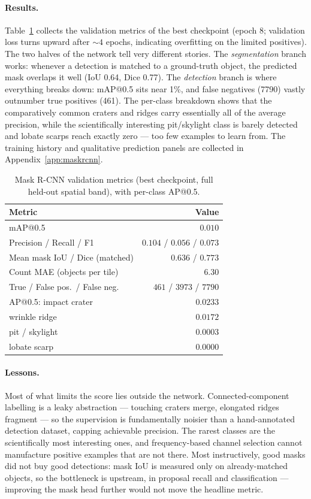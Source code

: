 \documentclass{aa}
\begin{document}
\paragraph{Results.}
Table~\ref{tab:metrics} collects the validation metrics of the best checkpoint (epoch 8; validation loss turns upward after ${\sim}4$ epochs, indicating overfitting on the limited positives). The two halves of the network tell very different stories. The \emph{segmentation} branch works: whenever a detection is matched to a ground-truth object, the predicted mask overlaps it well (IoU 0.64, Dice 0.77). The \emph{detection} branch is where everything breaks down: mAP@0.5 sits near 1\%, and false negatives (7790) vastly outnumber true positives (461). The per-class breakdown shows that the comparatively common craters and ridges carry essentially all of the average precision, while the scientifically interesting pit/skylight class is barely detected and lobate scarps reach exactly zero --- too few examples to learn from. The training history and qualitative prediction panels are collected in Appendix~\ref{app:maskrcnn}.

\begin{table}[htbp]
\caption{Mask R-CNN validation metrics (best checkpoint, full held-out spatial band), with per-class AP@0.5.}
\label{tab:metrics}
\centering
\small
\begin{tabular}{l r}
\toprule
Metric & Value \\
\midrule
mAP@0.5                       & $0.010$ \\
Precision / Recall / F1       & $0.104$ / $0.056$ / $0.073$ \\
Mean mask IoU / Dice (matched) & $0.636$ / $0.773$ \\
Count MAE (objects per tile)  & $6.30$ \\
True / False pos.\ / False neg.\ & $461$ / $3973$ / $7790$ \\
\midrule
AP@0.5: impact crater          & $0.0233$ \\
\phantom{AP@0.5:} wrinkle ridge   & $0.0172$ \\
\phantom{AP@0.5:} pit / skylight  & $0.0003$ \\
\phantom{AP@0.5:} lobate scarp    & $0.0000$ \\
\bottomrule
\end{tabular}
\end{table}

\paragraph{Lessons.}
Most of what limits the score lies outside the network. Connected-component labelling is a leaky abstraction --- touching craters merge, elongated ridges fragment --- so the supervision is fundamentally noisier than a hand-annotated detection dataset, capping achievable precision. The rarest classes are the scientifically most interesting ones, and frequency-based channel selection cannot manufacture positive examples that are not there. Most instructively, good masks did not buy good detections: mask IoU is measured only on already-matched objects, so the bottleneck is upstream, in proposal recall and classification --- improving the mask head further would not move the headline metric.
\end{document}
